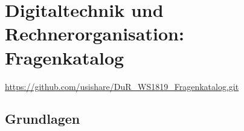 \documentclass
[
  draft    = true,
  fontsize = 11pt,
  parskip  = half-,
  BCOR     = 0pt,
  DIV      = 11,
  ngerman,
  dvipsnames
]
{scrartcl}
\begin{document}

\section*{Digitaltechnik und Rechnerorganisation: Fragenkatalog}

\url{https://github.com/usishare/DuR_WS1819_Fragenkatalog.git}

\newsavebox{\tempbox}%

\subsection*{Grundlagen}
\end{document}
